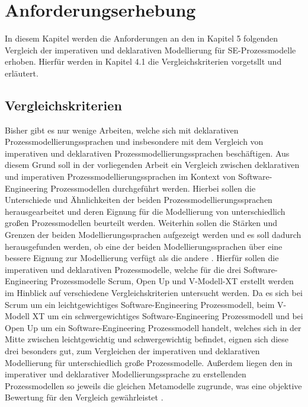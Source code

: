 
\chapter{Anforderungserhebung}\label{sec:chapter5}
In diesem Kapitel werden die Anforderungen an den in Kapitel 5 folgenden Vergleich der imperativen und deklarativen Modellierung für SE-Prozessmodelle erhoben. Hierfür werden in Kapitel 4.1 die Vergleichskriterien vorgetsllt und erläutert.

\section{Vergleichskriterien}\label{sec:chapter5:Vergleichskriterien}

Bisher gibt es nur wenige Arbeiten, welche sich mit deklarativen Prozessmodellierungssprachen und insbesondere mit dem Vergleich von imperativen und deklarativen Prozessmodellierungssprachen beschäftigen. Aus diesem Grund soll in der vorliegenden Arbeit ein Vergleich zwischen deklarativen und imperativen Prozessmodellierungssprachen im Kontext von Software-Engineering Prozessmodellen durchgeführt werden. Hierbei sollen die Unterschiede und Ähnlichkeiten der beiden Prozessmodellierungssprachen herausgearbeitet und deren Eignung für die Modellierung von unterschiedlich großen Prozessmodellen beurteilt werden. Weiterhin sollen die Stärken und Grenzen der beiden Modellierungssprachen aufgezeigt werden und es soll dadurch herausgefunden werden, ob eine der beiden Modellierungssprachen über eine bessere Eignung zur Modellierung verfügt als die andere \cite{list2006evaluation}.\newline
Hierfür sollen die imperativen und deklarativen Prozessmodelle, welche für die drei Software-Engineering Prozessmodelle Scrum, Open Up und V-Modell-XT erstellt werden im Hinblick auf verschiedene Vergleichskriterien untersucht werden. Da es sich bei Scrum um ein leichtgewichtiges Software-Engineering Prozessmodell, beim V-Modell XT um ein schwergewichtiges Software-Engineering Prozessmodell und bei Open Up um ein Software-Engineering Prozessmodell handelt, welches sich in der Mitte zwischen leichtgewichtig und schwergewichtig befindet, eignen sich diese drei besonders gut, zum Vergleichen der imperativen und deklarativen Modellierung für unterschiedlich große Prozessmodelle. Außerdem liegen den in imperativer und deklarativer Modellierungssprache zu erstellenden Prozessmodellen so jeweils die gleichen Metamodelle zugrunde, was eine objektive Bewertung für den Vergleich gewährleistet \cite{list2006evaluation}.  

